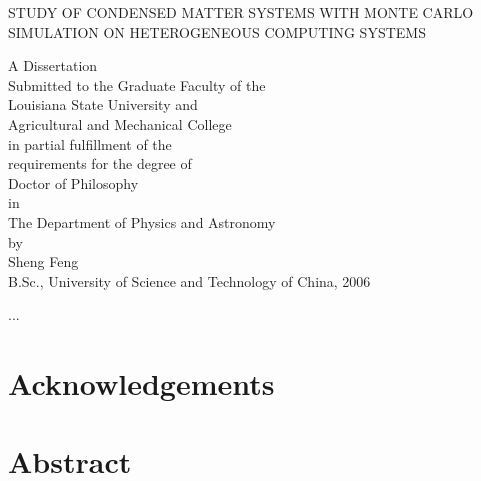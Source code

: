 \documentclass[edeposit,fullpage]{uiucthesis07}
\begin{document}
 \thispagestyle{empty} \begin{singlespace}

\begin{center}
\begin{Large}
STUDY OF CONDENSED MATTER SYSTEMS 
WITH MONTE CARLO SIMULATION
ON HETEROGENEOUS COMPUTING SYSTEMS
\end{Large}

\vspace{2.65in}

A Dissertation\\
\vspace{1.5ex}
Submitted to the Graduate Faculty of the\\
Louisiana State University and\\
Agricultural and Mechanical College\\
in partial fulfillment of the\\
requirements for the degree of\\
Doctor of Philosophy\\
\vspace{1ex}
in\\
\vspace{1ex}
The Department of Physics and Astronomy\\
\vspace{2.65in}
by\\
Sheng Feng\\
B.Sc., University of Science and Technology of China, 2006\\

\end{center}
\end{singlespace}
\frontmatter


\begin{dedication}
  ...
\end{dedication}

\chapter*{Acknowledgements}

\tableofcontents 

\chapter*{Abstract}
\end{document}
